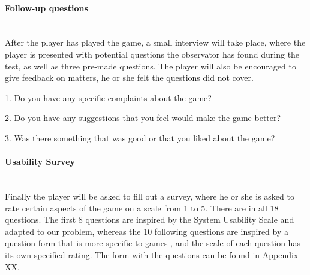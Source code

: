 	\paragraph{Follow-up questions}\mbox{}\\

		After the player has played the game, a small interview will take place, where the player is presented with potential questions the observator has found during the test, as well as three pre-made questions. The player will also be encouraged to give feedback on matters, he or she felt the questions did not cover.

		1. Do you have any specific complaints about the game?

		2. Do you have any suggestions that you feel would make the game better?

		3. Was there something that was good or that you liked about the game?

	\paragraph{Usability Survey}\mbox{}\\

		Finally the player will be asked to fill out a survey, where he or she is asked to rate certain aspects of the game on a scale from 1 to 5. There are in all 18 questions. The first 8 questions are inspired by the System Usability Scale \cite{sus} and adapted to our problem, whereas the 10 following questions are inspired by a question form that is more specific to games \cite{evaluationSheet}, and the scale of each question has its own specified rating. The form with the questions can be found in Appendix XX.

